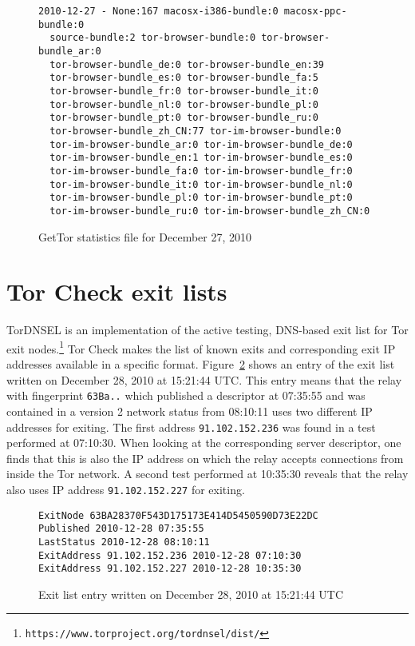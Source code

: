 \documentclass{article}
\begin{document}
\begin{figure}
\begin{verbatim}
2010-12-27 - None:167 macosx-i386-bundle:0 macosx-ppc-bundle:0
  source-bundle:2 tor-browser-bundle:0 tor-browser-bundle_ar:0
  tor-browser-bundle_de:0 tor-browser-bundle_en:39
  tor-browser-bundle_es:0 tor-browser-bundle_fa:5
  tor-browser-bundle_fr:0 tor-browser-bundle_it:0
  tor-browser-bundle_nl:0 tor-browser-bundle_pl:0
  tor-browser-bundle_pt:0 tor-browser-bundle_ru:0
  tor-browser-bundle_zh_CN:77 tor-im-browser-bundle:0
  tor-im-browser-bundle_ar:0 tor-im-browser-bundle_de:0
  tor-im-browser-bundle_en:1 tor-im-browser-bundle_es:0
  tor-im-browser-bundle_fa:0 tor-im-browser-bundle_fr:0
  tor-im-browser-bundle_it:0 tor-im-browser-bundle_nl:0
  tor-im-browser-bundle_pl:0 tor-im-browser-bundle_pt:0
  tor-im-browser-bundle_ru:0 tor-im-browser-bundle_zh_CN:0
\end{verbatim}
\vspace{-1em}
\caption{GetTor statistics file for December 27, 2010}
\label{fig:gettor}
\end{figure}

\section{Tor Check exit lists}
\label{sec:exitlist}

TorDNSEL is an implementation of the active testing, DNS-based exit list
for Tor exit
nodes.\footnote{\texttt{https://www.torproject.org/tordnsel/dist/}}
Tor Check makes the list of known exits and corresponding exit IP
addresses available in a specific format.
Figure~\ref{fig:exitlist} shows an entry of the exit list written on
December 28, 2010 at 15:21:44 UTC.
This entry means that the relay with fingerprint \verb+63Ba..+ which
published a descriptor at 07:35:55 and was contained in a version 2
network status from 08:10:11 uses two different IP addresses for exiting.
The first address \verb+91.102.152.236+ was found in a test performed at
07:10:30.
When looking at the corresponding server descriptor, one finds that this
is also the IP address on which the relay accepts connections from inside
the Tor network.
A second test performed at 10:35:30 reveals that the relay also uses IP
address \verb+91.102.152.227+ for exiting.

\begin{figure}
\begin{verbatim}
ExitNode 63BA28370F543D175173E414D5450590D73E22DC
Published 2010-12-28 07:35:55
LastStatus 2010-12-28 08:10:11
ExitAddress 91.102.152.236 2010-12-28 07:10:30
ExitAddress 91.102.152.227 2010-12-28 10:35:30
\end{verbatim}
\vspace{-1em}
\caption{Exit list entry written on December 28, 2010 at 15:21:44 UTC}
\label{fig:exitlist}
\end{figure}



\end{document}
